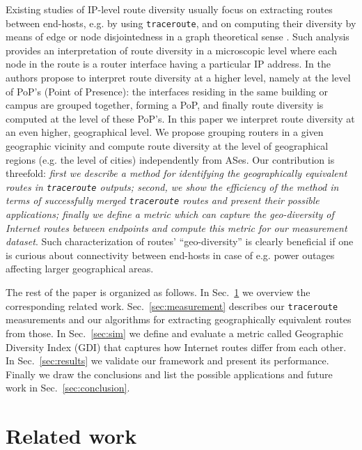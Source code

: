 \documentclass[peerreview]{IEEEtran}
\begin{document}
Existing studies of IP-level route diversity usually focus on extracting routes
between end-hosts, e.g. by using \texttt{traceroute}, and on computing their
diversity by means of edge or node disjointedness in a graph theoretical sense
\cite{schwartz2010diversity,muhlbauer2006building, teixeira2003search}. Such
analysis provides an interpretation of route diversity in a microscopic level
where each node in the route is a router interface having a particular IP
address. In \cite{shavitt2012geographical} the authors propose to interpret
route diversity at a higher level, namely at the level of PoP's (Point of
Presence): the interfaces residing in the same building or campus are grouped
together, forming a PoP, and finally route diversity is computed at the level of
these PoP's. In this paper we interpret route diversity at an even higher,
geographical level. We propose grouping routers in a given geographic vicinity
and compute route diversity at the level of geographical regions (e.g. the level
of cities) independently from ASes. Our contribution is threefold: \textit{first
  we describe a method for identifying the geographically equivalent routes in
  \texttt{traceroute} outputs; second, we show the efficiency of the method in
  terms of successfully merged \texttt{traceroute} routes and present their
  possible applications; finally we define a metric which can capture the
  geo-diversity of Internet routes between endpoints and compute this metric for
  our measurement dataset}. Such characterization of routes' ``geo-diversity''
is clearly beneficial if one is curious about connectivity between end-hosts in
case of e.g. power outages affecting larger geographical areas.

The rest of the paper is organized as follows. In Sec.~\ref{related} we overview
the corresponding related work. Sec.~\ref{sec:measurement} describes our
\texttt{traceroute} measurements and our algorithms for extracting
geographically equivalent routes from those. In Sec.~\ref{sec:sim} we define and
evaluate a metric called Geographic Diversity Index (GDI) that captures how
Internet routes differ from each other. In Sec.~\ref{sec:results} we validate
our framework and present its performance. Finally we draw the conclusions and
list the possible applications and future work in Sec.~\ref{sec:conclusion}.
  
\section{Related work}\label{related}
\end{document}
